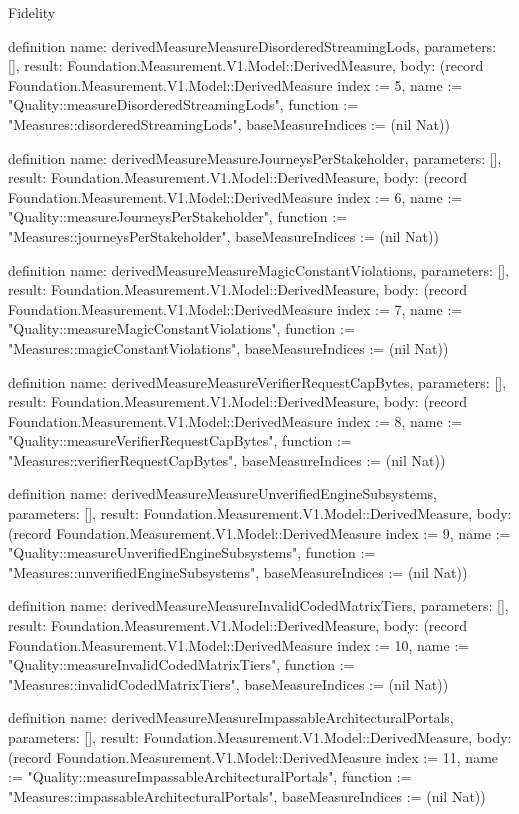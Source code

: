 \begin{lexlean}{Fidelity}
\begin{semanticmodule}
definition{
  name: derivedMeasureMeasureDisorderedStreamingLods,
  parameters: [],
  result: Foundation.Measurement.V1.Model::DerivedMeasure,
  body: (record Foundation.Measurement.V1.Model::DerivedMeasure {index := 5, name := "Quality::measureDisorderedStreamingLods", function := "Measures::disorderedStreamingLods", baseMeasureIndices := (nil Nat)})
}

definition{
  name: derivedMeasureMeasureJourneysPerStakeholder,
  parameters: [],
  result: Foundation.Measurement.V1.Model::DerivedMeasure,
  body: (record Foundation.Measurement.V1.Model::DerivedMeasure {index := 6, name := "Quality::measureJourneysPerStakeholder", function := "Measures::journeysPerStakeholder", baseMeasureIndices := (nil Nat)})
}

definition{
  name: derivedMeasureMeasureMagicConstantViolations,
  parameters: [],
  result: Foundation.Measurement.V1.Model::DerivedMeasure,
  body: (record Foundation.Measurement.V1.Model::DerivedMeasure {index := 7, name := "Quality::measureMagicConstantViolations", function := "Measures::magicConstantViolations", baseMeasureIndices := (nil Nat)})
}

definition{
  name: derivedMeasureMeasureVerifierRequestCapBytes,
  parameters: [],
  result: Foundation.Measurement.V1.Model::DerivedMeasure,
  body: (record Foundation.Measurement.V1.Model::DerivedMeasure {index := 8, name := "Quality::measureVerifierRequestCapBytes", function := "Measures::verifierRequestCapBytes", baseMeasureIndices := (nil Nat)})
}

definition{
  name: derivedMeasureMeasureUnverifiedEngineSubsystems,
  parameters: [],
  result: Foundation.Measurement.V1.Model::DerivedMeasure,
  body: (record Foundation.Measurement.V1.Model::DerivedMeasure {index := 9, name := "Quality::measureUnverifiedEngineSubsystems", function := "Measures::unverifiedEngineSubsystems", baseMeasureIndices := (nil Nat)})
}

definition{
  name: derivedMeasureMeasureInvalidCodedMatrixTiers,
  parameters: [],
  result: Foundation.Measurement.V1.Model::DerivedMeasure,
  body: (record Foundation.Measurement.V1.Model::DerivedMeasure {index := 10, name := "Quality::measureInvalidCodedMatrixTiers", function := "Measures::invalidCodedMatrixTiers", baseMeasureIndices := (nil Nat)})
}

definition{
  name: derivedMeasureMeasureImpassableArchitecturalPortals,
  parameters: [],
  result: Foundation.Measurement.V1.Model::DerivedMeasure,
  body: (record Foundation.Measurement.V1.Model::DerivedMeasure {index := 11, name := "Quality::measureImpassableArchitecturalPortals", function := "Measures::impassableArchitecturalPortals", baseMeasureIndices := (nil Nat)})
}


\end{semanticmodule}
\end{lexlean}

